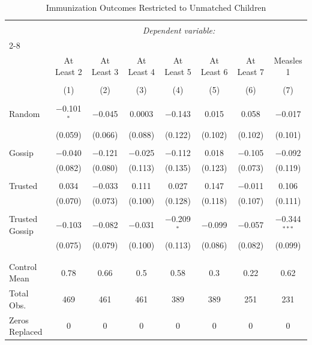 
\begin{table}[!htbp] \centering 
  \caption{Immunization Outcomes Restricted to Unmatched Children} 
  \label{} 
\scriptsize 
\begin{tabular}{@{\extracolsep{0.25pt}}lccccccc} 
\\[-1.8ex]\hline 
\hline \\[-1.8ex] 
 & \multicolumn{7}{c}{\textit{Dependent variable:}} \\ 
\cline{2-8} 
\\[-1.8ex] & At Least 2 & At Least 3 & At Least 4 & At Least 5 & At Least 6 & At Least 7 & Measles 1 \\ 
\\[-1.8ex] & (1) & (2) & (3) & (4) & (5) & (6) & (7)\\ 
\hline \\[-1.8ex] 
 Random & $-$0.101$^{*}$ & $-$0.045 & 0.0003 & $-$0.143 & 0.015 & 0.058 & $-$0.017 \\ 
  & (0.059) & (0.066) & (0.088) & (0.122) & (0.102) & (0.102) & (0.101) \\ 
  & & & & & & & \\ 
 Gossip & $-$0.040 & $-$0.121 & $-$0.025 & $-$0.112 & 0.018 & $-$0.105 & $-$0.092 \\ 
  & (0.082) & (0.080) & (0.113) & (0.135) & (0.123) & (0.073) & (0.119) \\ 
  & & & & & & & \\ 
 Trusted & 0.034 & $-$0.033 & 0.111 & 0.027 & 0.147 & $-$0.011 & 0.106 \\ 
  & (0.070) & (0.073) & (0.100) & (0.128) & (0.118) & (0.107) & (0.111) \\ 
  & & & & & & & \\ 
 Trusted Gossip & $-$0.103 & $-$0.082 & $-$0.031 & $-$0.209$^{*}$ & $-$0.099 & $-$0.057 & $-$0.344$^{***}$ \\ 
  & (0.075) & (0.079) & (0.100) & (0.113) & (0.086) & (0.082) & (0.099) \\ 
  & & & & & & & \\ 
\hline \\[-1.8ex] 
Control Mean & 0.78 & 0.66 & 0.5 & 0.58 & 0.3 & 0.22 & 0.62 \\ 
Total Obs. & 469 & 461 & 461 & 389 & 389 & 251 & 231 \\ 
Zeros Replaced & 0 & 0 & 0 & 0 & 0 & 0 & 0 \\ 
\hline 

\end{tabular}
\end{table}
